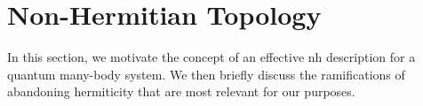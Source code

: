 \section{Non-Hermitian Topology}\label{chap:ep}
In this section, we motivate the concept of an effective \gls{nh} description for a quantum many-body system.
We then briefly discuss the ramifications of abandoning hermiticity that are most relevant for our purposes.
